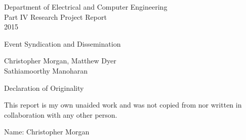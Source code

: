 \begin{titlepage}


\vspace*{20em}
\centering

{
	\large
	Department of Electrical and Computer Engineering\\
	Part IV Research Project Report\\
	2015

	\vspace{3em}

	\LARGE
	Event Syndication and Dissemination\\
}

\vspace*{4em}

Christopher Morgan, Matthew Dyer \\
Sathiamoorthy Manoharan

\vspace*{\fill}


\pagebreak
\vspace*{\fill}

{
	\Large 
	Declaration of Originality
}

\hspace{5em}

This report is my own unaided work and was not copied from nor written in collaboration with any other person.

Name: Christopher Morgan

\vspace*{\fill}
\end{titlepage}